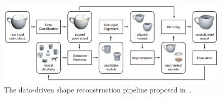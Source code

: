 \begin{figure}[t]
\centering
    \includegraphics[width=1.0\columnwidth]{fig/img/pauly_sgp05_esr.png}
    \caption{The data-driven shape reconstruction pipeline proposed in~\cite{Pauly:2005:ESC}.}
    \label{fig:pauly_sgp05_esr}
\end{figure}


